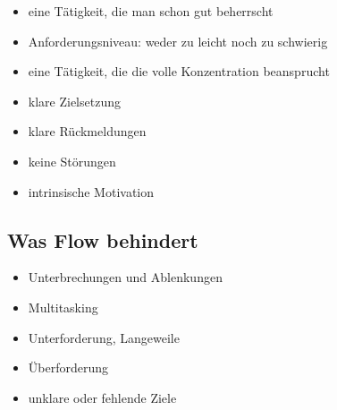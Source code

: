 \begin{itemize}
  \item eine Tätigkeit, die man schon gut beherrscht
  \item Anforderungsniveau: weder zu leicht noch zu schwierig
  \item eine Tätigkeit, die die volle Konzentration beansprucht
  \item klare Zielsetzung
  \item klare Rückmeldungen
  \item keine Störungen
  \item intrinsische Motivation
\end{itemize}


\subsection{Was Flow behindert}

\begin{itemize}
  \item Unterbrechungen und Ablenkungen
  \item Multitasking
  \item Unterforderung, Langeweile
  \item Überforderung
  \item unklare oder fehlende Ziele
\end{itemize}
